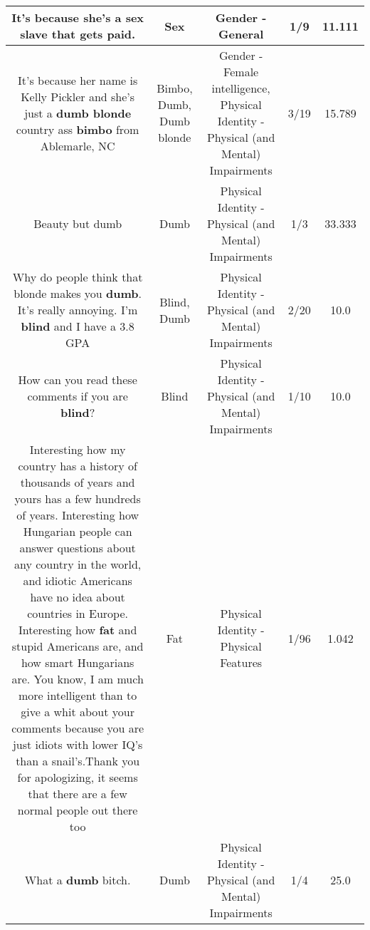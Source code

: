 \documentclass[11pt]{article}
\newlength\mylength
\begin{document}
\begin{center}
\begin{longtable}{|C{.65\mylength}|C{.30\mylength}|C{.12\mylength}|C{.12\mylength}|C{.12\mylength}|}
  \small It's because she's a \textbf{sex} slave that gets paid.\normalsize   & Sex & Gender - General & 1/9 & 11.111 \\  \hline
  \small It's because her name is Kelly Pickler and she's just a \textbf{d\textbf{umb} blonde} country ass \textbf{bimbo} from Ablemarle, NC\normalsize   & Bimbo, Dumb, Dumb blonde & Gender - Female intelligence, Physical Identity - Physical (and Mental) Impairments & 3/19 & 15.789 \\  \hline
  \small Beauty but dumb\normalsize   & Dumb & Physical Identity - Physical (and Mental) Impairments & 1/3 & 33.333 \\  \hline
  \small Why do people think that blonde makes you \textbf{dumb}. It's really annoying. I'm \textbf{blind} and I have a 3.8 GPA\normalsize   & Blind, Dumb & Physical Identity - Physical (and Mental) Impairments & 2/20 & 10.0 \\  \hline
  \small How can you read these comments if you are \textbf{blind}?\normalsize   & Blind & Physical Identity - Physical (and Mental) Impairments & 1/10 & 10.0 \\  \hline
  \small Interesting how my country has a history of thousands of years and yours has a few hundreds of years. Interesting how Hungarian people can answer questions about any country in the world, and  idiotic Americans have no idea about countries in Europe. Interesting how \textbf{fat} and stupid Americans are, and how smart Hungarians are. You know, I am much more intelligent than to give a whit about your comments because you are just idiots with lower IQ's than a snail's.Thank you for apologizing, it seems that there are a few normal people out there too\normalsize   & Fat & Physical Identity - Physical Features & 1/96 & 1.042 \\  \hline
  \small What a \textbf{dumb} bitch.\normalsize   & Dumb & Physical Identity - Physical (and Mental) Impairments & 1/4 & 25.0 \\  \hline

\end{longtable}
\end{center}
\end{document}
